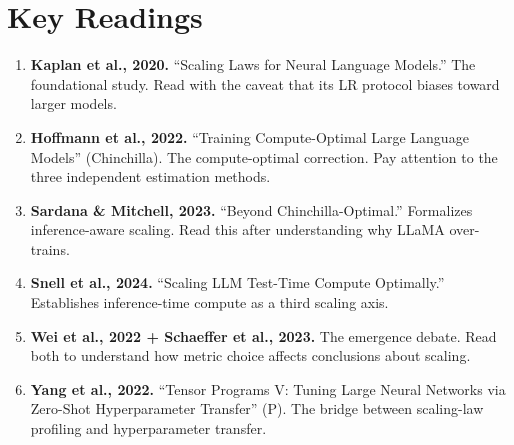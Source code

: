 \section*{Key Readings}

\begin{enumerate}[nosep]
  \item \textbf{Kaplan et al., 2020.} ``Scaling Laws for Neural Language Models.'' The foundational study. Read with the caveat that its LR protocol biases toward larger models.
  \item \textbf{Hoffmann et al., 2022.} ``Training Compute-Optimal Large Language Models'' (Chinchilla). The compute-optimal correction. Pay attention to the three independent estimation methods.
  \item \textbf{Sardana \& Mitchell, 2023.} ``Beyond Chinchilla-Optimal.'' Formalizes inference-aware scaling. Read this after understanding why LLaMA over-trains.
  \item \textbf{Snell et al., 2024.} ``Scaling LLM Test-Time Compute Optimally.'' Establishes inference-time compute as a third scaling axis.
  \item \textbf{Wei et al., 2022 + Schaeffer et al., 2023.} The emergence debate. Read both to understand how metric choice affects conclusions about scaling.
  \item \textbf{Yang et al., 2022.} ``Tensor Programs V: Tuning Large Neural Networks via Zero-Shot Hyperparameter Transfer'' (\textmu P). The bridge between scaling-law profiling and hyperparameter transfer.
\end{enumerate}
